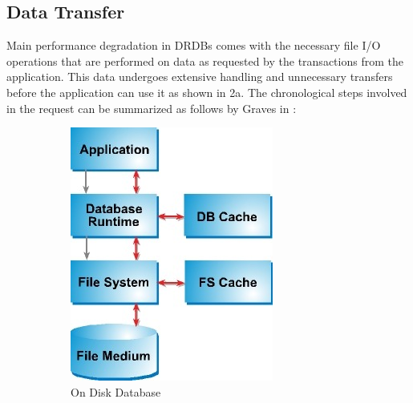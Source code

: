 \documentclass[12pt]{article} %
\begin{document}
\subsection{Data Transfer}
Main performance degradation in DRDBs comes with the necessary file I/O operations that are performed on data as requested by the transactions from the application. This data undergoes extensive handling and unnecessary transfers before the application can use it as shown in \figurename{2a}. The chronological steps involved in the request can be summarized as follows by Graves in \cite{graves2002memory}:

\begin{figure}
	\centering
	\begin{subfigure}[b]{0.3\textwidth}
		\centering
		\includegraphics[width=\textwidth]{./pictures/fig3}
		\caption{On Disk Database}
		\label{fig:fig3a}
	\end{subfigure}
	\qquad \qquad
	\begin{subfigure}[b]{0.3\textwidth}
		\centering

\end{subfigure}
\end{figure}
\end{document}
